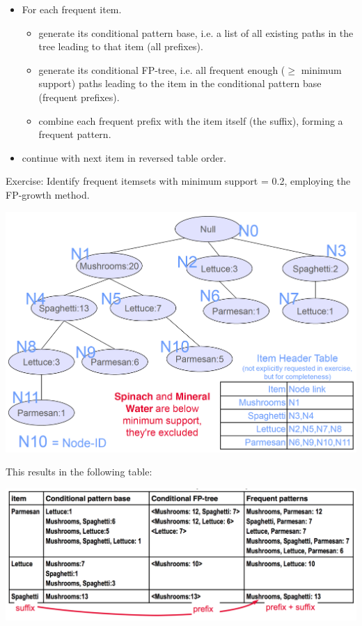 \begin{breakbox}
\begin{itemize}
\begin{itemize}
			\item For each frequent item.
				\begin{itemize}
					\item generate its conditional pattern base, i.e. a list of all existing paths in the tree leading to that item (all prefixes).
					\item generate its conditional FP-tree, i.e. all frequent enough ($\geq$ minimum support) paths leading to the item in the conditional pattern base (frequent prefixes).
					\item combine each frequent prefix with the item itself (the suffix), forming a frequent pattern.
				\end{itemize}
			\item continue with next item in reversed table order.
		\end{itemize}
\end{itemize}
Exercise: Identify frequent itemsets with minimum support = 0.2, employing the FP-growth method.
\begin{center}
\includegraphics[width=.15\textwidth]{slides_images/fp_tree}
\end{center}
This results in the following table:
\begin{center}
\includegraphics[width=.15\textwidth]{slides_images/frequent_patterns}
\end{center}
\end{breakbox}

